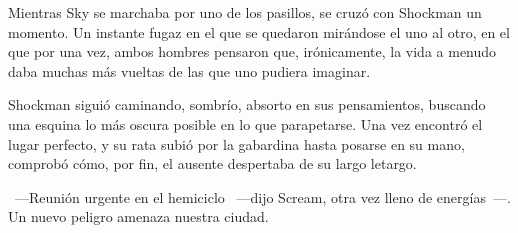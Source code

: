 Mientras Sky se marchaba por uno de los pasillos, se cruzó con Shockman un momento. Un instante fugaz en el que se quedaron mirándose el uno al otro, en el que por una vez, ambos hombres pensaron que, irónicamente, la vida a menudo daba muchas más vueltas de las que uno pudiera imaginar.

Shockman siguió caminando, sombrío, absorto en sus pensamientos, buscando una esquina lo más oscura posible en lo que parapetarse. Una vez encontró el lugar perfecto, y su rata subió por la gabardina hasta posarse en su mano, comprobó cómo, por fin, el ausente despertaba de su largo letargo.

~---Reunión urgente en el hemiciclo ~---dijo Scream, otra vez lleno de energías~---. Un nuevo peligro amenaza nuestra ciudad.
